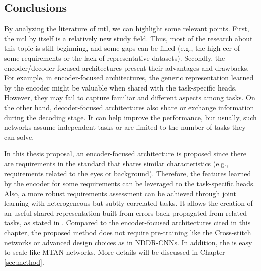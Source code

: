 \subsection{Conclusions}

By analyzing the literature of \acl{mtl}, we can highlight some relevant points. First, the \acs{mtl} by itself is a relatively new study field. Thus, most of the research about this topic is still beginning, and some gaps can be filled (e.g., the high \acs{eer} of some requirements or the lack of representative datasets). Secondly, the encoder/decoder-focused architectures present their advantages and drawbacks. For example, in encoder-focused architectures, the generic representation learned by the encoder might be valuable when shared with the task-specific heads. However, they may fail to capture familiar and different aspects among tasks. On the other hand, decoder-focused architectures also share or exchange information during the decoding stage. It can help improve the performance, but usually, such networks assume independent tasks or are limited to the number of tasks they can solve. 

In this thesis proposal, an encoder-focused architecture is proposed since there are requirements in the \icao standard that shares similar characteristics (e.g., requirements related to the eyes or background). Therefore, the features learned by the encoder for some requirements can be leveraged to the task-specific heads. Also, a more robust requirements assessment can be achieved through joint learning with heterogeneous but subtly correlated tasks. It allows the creation of an useful shared representation built from errors back-propagated from related tasks, as stated in \citep{zhang2014facial}. Compared to the encoder-focused architectures cited in this chapter, the proposed method does not require pre-training like the Cross-stitch networks or advanced design choices as in NDDR-CNNs. In addition, the \methodname is easy to scale like MTAN networks. More details will be discussed in Chapter \ref{sec:method}.

